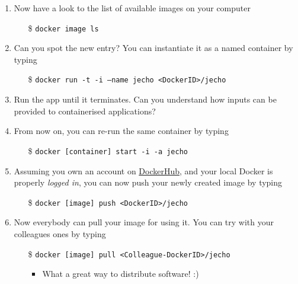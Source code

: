 \documentclass[presentation]{beamer}\mode<presentation>{\usetheme{AMSBolognaFC}}
\begin{document}
\begin{frame}[allowframebreaks]
\begin{enumerate}
        \item Now have a look to the list of available images on your computer
        \begin{itemize}
            \item[\$] \texttt{docker image ls}
        \end{itemize}

        \item Can you spot the new entry? You can instantiate it as a \alert{named} container by typing
        \begin{itemize}
            \item[\$] \texttt{docker run -t -i \alert{--name jecho} <DockerID>/jecho}
        \end{itemize}

        \item Run the app until it terminates. Can you understand how inputs can be provided to containerised applications?

        \framebreak

        \item From now on, you can re-run the \alert{same} container by typing
        \begin{itemize}
            \item[\$] \texttt{docker [container] \alert{start} -i -a jecho}
        \end{itemize}

        \item Assuming you own an account on \href{https://hub.docker.com/}{DockerHub}, and your local Docker is properly \emph{logged in}, you can now \alert{push} your newly created image by typing
        \begin{itemize}
            \item[\$] \texttt{docker [image] \alert{push} <DockerID>/jecho}
        \end{itemize}

        \item Now everybody can \alert{pull} your image for using it. You can try with your colleagues ones by typing
        \begin{itemize}
            \item[\$] \texttt{docker [image] \alert{pull} <Colleague-DockerID>/jecho}
            \begin{itemize}
                \item What a great way to distribute software! :)
            \end{itemize}
        \end{itemize}

    \end{enumerate}

\end{frame}
\end{document}
